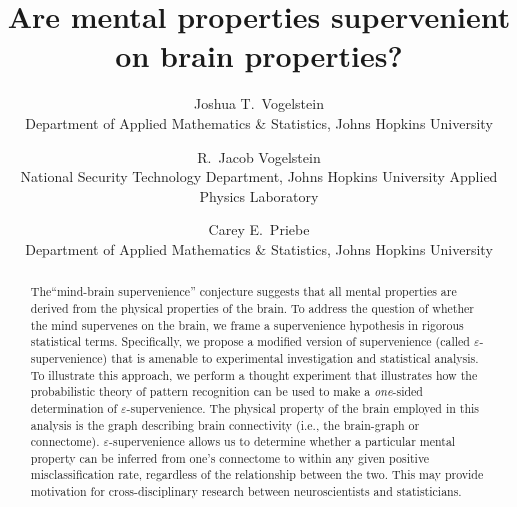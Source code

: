 \documentclass{article}
\newcommand{\eps}{\varepsilon}
\begin{document}
\title{Are mental properties supervenient on brain properties?}
\author{Joshua T.~Vogelstein\\ Department of Applied Mathematics \& Statistics,  Johns Hopkins University
        \and 
		R.~Jacob Vogelstein \\ National Security Technology Department, Johns Hopkins University Applied Physics Laboratory
		\and 
		Carey E.~Priebe \\ Department of Applied Mathematics \& Statistics,  Johns Hopkins University}

\date{}
\maketitle

% 
% 
% 	
% 

	
\begin{abstract}
\noindent The``mind-brain supervenience'' conjecture suggests that all mental properties are derived from the physical properties of the brain. To address the question of whether the mind supervenes on the brain, we frame a supervenience hypothesis in rigorous statistical terms. Specifically, we propose a modified version of supervenience (called $\eps$-supervenience) that is amenable to experimental investigation and statistical analysis. To illustrate this approach, we perform a thought experiment that illustrates how the probabilistic theory of pattern recognition can be used to make a \emph{one}-sided determination of $\eps$-supervenience. The physical property of the brain employed in this analysis is the graph describing brain connectivity (i.e., the brain-graph or connectome). $\eps$-supervenience allows us to determine whether a particular mental property can be inferred from one's connectome to within any given positive misclassification rate, regardless of the relationship between the two. This may provide motivation for cross-disciplinary research between neuroscientists and statisticians.
\end{abstract}
\end{document}
